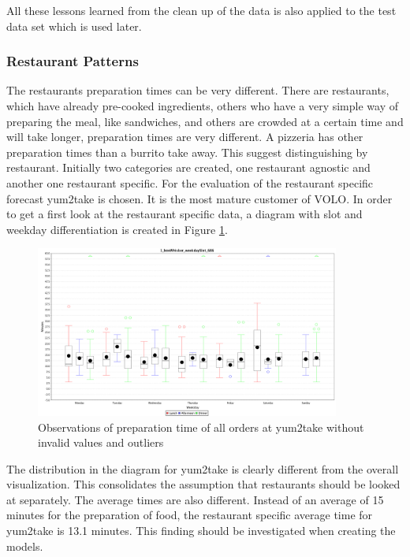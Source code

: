 All these lessons learned from the clean up of the data is also applied to the test data set which is used later.

\subsubsection{Restaurant Patterns}\label{subsection:Restaurant Wise Proceeding}
The restaurants preparation times can be very different. There are restaurants, which have already pre-cooked ingredients, others who have a very simple way of preparing the meal, like sandwiches, and others are crowded at a certain time and will take longer, preparation times are very different. A pizzeria has other preparation times than a burrito take away.\newline
This suggest distinguishing by restaurant. Initially two categories are created, one restaurant agnostic and another one restaurant specific. For the evaluation of the restaurant specific forecast yum2take is chosen. It is the most mature customer of VOLO.\newline
In order to get a first look at the restaurant specific data, a diagram with slot and weekday differentiation is created in Figure \ref{fig:1_boxWhisker_weekdaySlot_686}.
\begin{figure}[h]
\begin{center}
\includegraphics[width=10cm]{images/1_boxWhisker_weekdaySlot_686.png}
\caption{Observations of preparation time of all orders at yum2take without invalid values and outliers}
\label{fig:1_boxWhisker_weekdaySlot_686}
\end{center}
\end{figure}
The distribution in the diagram for yum2take is clearly different from the overall visualization. This consolidates the assumption that restaurants should be looked at separately. The average times are also different. Instead of an average of 15 minutes for the preparation of food, the restaurant specific average time for yum2take is 13.1 minutes. This finding should be investigated when creating the models.
